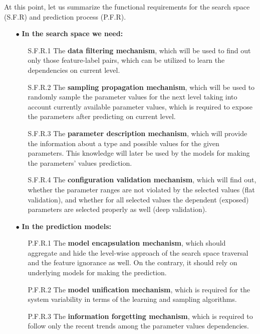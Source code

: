 At this point, let us summarize the functional requirements for the search space (S.F.R) and prediction process (P.F.R).
\begin{samepage}
\begin{itemize}
	\item[$\bullet$] \textbf{In the search space we need:}
	\begin{enumerate}
		\item[S.F.R.1] The \textbf{data filtering mechanism}, which will be used to find out only those feature-label pairs, which can be utilized to learn the dependencies on current level.
		
		\item[S.F.R.2] The \textbf{sampling propagation mechanism}, which will be used to randomly sample the parameter values for the next level taking into account currently available parameter values, which is required to expose the parameters after predicting on current level.
		
		\item[S.F.R.3] The \textbf{parameter description mechanism}, which will provide the information about a type and possible values for the given parameters. This knowledge will later be used by the models for making the parameters' values prediction.
		
		\item[S.F.R.4] The \textbf{configuration validation mechanism}, which will find out, whether the parameter ranges are not violated by the selected values (flat validation), and whether for all selected values the dependent (exposed) parameters are selected properly as well (deep validation).
	\end{enumerate}

	\item[$\bullet$] \textbf{In the prediction models:}
	\begin{enumerate}
		\item[P.F.R.1] The \textbf{model encapsulation mechanism}, which should aggregate and hide the level-wise approach of the search space traversal and the feature ignorance as well. On the contrary, it should rely on underlying models for making the prediction.
		
		\item[P.F.R.2] The \textbf{model unification mechanism}, which is required for the system variability in terms of the learning and sampling algorithms.
		
		\item[P.F.R.3] The \textbf{information forgetting mechanism}, which is required to follow only the recent trends among the parameter values dependencies.
	\end{enumerate}
\end{itemize}
\end{samepage}

